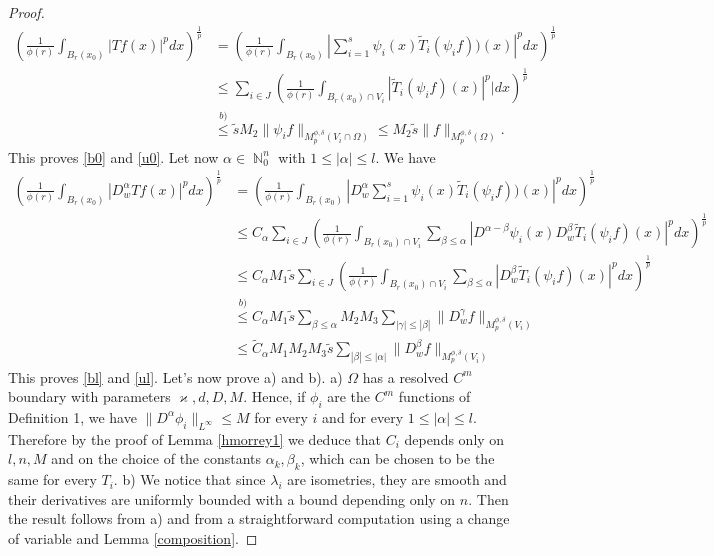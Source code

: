 \documentclass[12pt]{article}
\theoremstyle{definition}
\DeclareMathOperator\nn{\mathbb{N}}
\begin{document}
\begin{proof}
\begin{align*}
\left( \frac{1}{\phi(r)} \int_{B_r(x_0)} |Tf(x)|^pdx  \right)^{\frac{1}{p}} &=  \left( \frac{1}{\phi(r)} \int_{B_r(x_0)} |\sum_{i=1}^s \psi_i(x) \widetilde T_i(\psi_if))(x) |^pdx \right)^{\frac{1}{p}}\\
&\le \sum_{i \in J} \left( \frac{1}{\phi(r)} \int_{{B_r(x_0)} \cap V_i} | \widetilde T_i(\psi_if)(x)|^p |dx \right)^{\frac{1}{p}}\\
&\overset{b)}\le \widetilde s M_2\| \psi_i f\|_{M_p^{\phi,\delta}(V_i \cap \Omega)} \le M_2\widetilde s \| f\|_{M_p^{\phi,\delta}(\Omega)}.
\end{align*}
This proves \eqref{b0} and \eqref{u0}. Let now $\alpha \in \nn_0^n$ with $1\le|\alpha|\le l.$ We have 
\begin{align*}
\left( \frac{1}{\phi(r)} \int_{B_r(x_0)} |D^\alpha_w Tf(x)|^pdx  \right)^{\frac{1}{p}} &=  \left( \frac{1}{\phi(r)} \int_{B_r(x_0)} |D^\alpha_w \sum_{i=1}^s \psi_i(x) \widetilde T_i(\psi_if))(x) |^pdx \right)^{\frac{1}{p}}\\
&\le C_\alpha \sum_{i \in J} \left( \frac{1}{\phi(r)} \int_{{B_r(x_0)} \cap V_i} \sum_{\beta \le \alpha}|D^{\alpha -\beta}\psi_i(x) D^\beta_w \widetilde T_i(\psi_if)(x)|^p dx \right)^{\frac{1}{p}}\\
&\le C_\alpha M_1 \widetilde s \sum_{i \in J} \left( \frac{1}{\phi(r)} \int_{{B_r(x_0)} \cap V_i} \sum_{\beta \le \alpha}|D^\beta_w \widetilde T_i(\psi_if)(x)|^p dx \right)^{\frac{1}{p}}\\
&\overset{b)}\le C_\alpha M_1\widetilde s \sum_{\beta \le \alpha } M_2M_3 \sum_{|\gamma|\le |\beta|} \| D^\gamma_w f\|_{M_p^{\phi,\delta}(V_i)} \\
&  \le \widetilde C_\alpha M_1M_2M_3\widetilde s \sum_{|\beta| \le |\alpha|}\| D^\beta_w f\|_{M_p^{\phi,\delta}(V_i)} 
\end{align*}
This proves \eqref{bl} and \eqref{ul}. Let's now prove a) and b). a) $\Omega$ has a resolved $C^m$ boundary with parameters $\varkappa,d,D,M$. Hence, if $\phi_i$ are the $C^m$ functions of Definition 1, we have $\| D^{\alpha}\phi_i \|_{L^\infty}\le M$ for every $i$ and for every $1\le|\alpha|\le l$. Therefore by the proof of Lemma \ref{hmorrey1} we deduce that $C_i$ depends only on $l,n,M$ and on the choice of the constants $\alpha_k,\beta_k$, which can be chosen to be the same for every $T_i$.
b) We notice that since $\lambda_i$ are isometries, they are smooth and their derivatives are uniformly bounded with a bound depending only on $n$. Then the result follows from a) and from a straightforward computation using a change of variable and Lemma \ref{composition}.
\end{proof}
	
\end{document}
